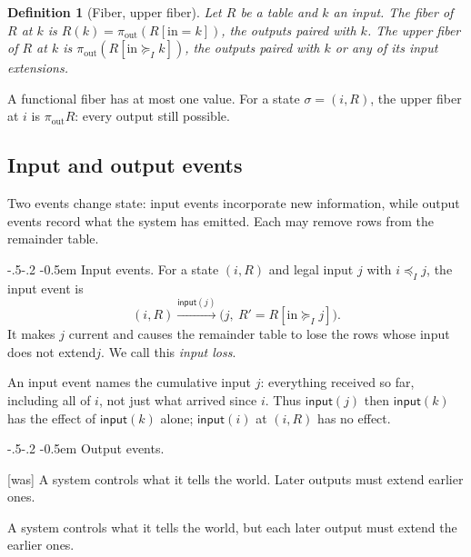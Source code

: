 \documentclass[sigconf]{cidr-2027}
\makeatletter
\newtheorem{definition}{Definition}
\theoremstyle{remark}
\renewcommand\paragraph{\@startsection{paragraph}{4}{\z@}%
  {-.5\baselineskip \@plus -2\p@ \@minus -.2\p@}%
  {-0.5em}%
  {\normalfont\bfseries}}
\newcommand{\InputOrd}{\preceq_I}
\newcommand{\InputGe}{\succeq_I}
\newcommand{\inrelbase}{extend\xspace}       %
\newcommand{\indescs}{input extensions\xspace}
\newcommand{\outrelbase}{extend\xspace}       %
\makeatother
\begin{document}
\begin{definition}[Fiber, upper fiber]
\label{def:fiber}
Let $R$ be a table and $k$ an input.  The \emph{fiber} of $R$ at $k$ is
$R(k)=\pi_{\mathrm{out}}(R[\mathrm{in}=k])$, the outputs paired with $k$.  The
\emph{upper fiber} of $R$ at $k$ is $\pi_{\mathrm{out}}(R[\mathrm{in}\InputGe
k])$, the outputs paired with $k$ or any of its \indescs.
\end{definition}

A functional fiber has at most one value.  For a state $\sigma=(i,R)$, the
upper fiber at $i$ is $\pi_{\mathrm{out}}R$: every output still possible.

\subsection{Input and output events}
\label{sec:functional-events}

Two events change state: input events incorporate new information, while
output events record what the system has emitted.  Each may remove rows from
the remainder table.

\paragraph{Input events.}
For a state $(i,R)$ and legal input $j$ with $i\InputOrd j$, the input event is
\begin{equation}
  (i,R)\xrightarrow{\mathsf{input}(j)}
  \bigl(j,\ R' = R[\mathrm{in}\InputGe j]\bigr).
  \label{eq:input-event}
\end{equation}
It makes $j$ current and causes the remainder table to lose the rows whose
input does not \inrelbase $j$.  We call this \emph{input loss}.

An input event names the cumulative input $j$: everything received so far,
including all of $i$, not just what arrived since $i$.  Thus $\mathsf{input}(j)$ then $\mathsf{input}(k)$ has the
effect of $\mathsf{input}(k)$ alone; $\mathsf{input}(i)$ at
$(i,R)$ has no effect.

\paragraph{Output events.}


{\footnotesize\color{black!50}\noindent\textsf{[was]} A system controls what it tells the world.  Later outputs must \outrelbase
earlier ones.\par}

\color{blue!70!black}A system controls what it tells the world, but each later output must
\outrelbase the earlier ones.\color{black}
\end{document}

